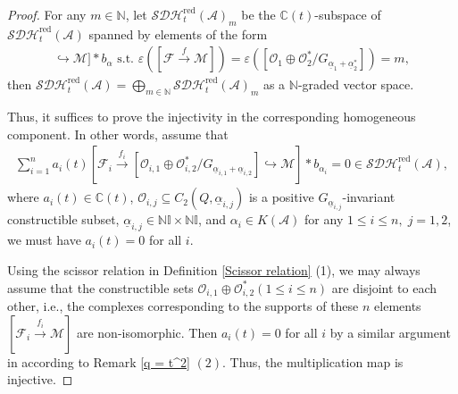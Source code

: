 \documentclass[12pt]{amsart}
\theoremstyle{definition}
\numberwithin{equation}{section}
\begin{document}
\begin{proof}
    For any $ m \in \mathbb{N} $, let $ \mathcal{SDH}^{\mathrm{red}}_t(\mathcal{A})_m  $ be the $ \mathbb{C}(t) $-subspace of $ \mathcal{SDH}^{\mathrm{red}}_t(\mathcal{A}) $ spanned by elements of the form
    \begin{align*}
        [\mathcal{F}\xrightarrow{f}[\mathcal{O}_1\oplus \mathcal{O}_2^*/G_{\underline{\alpha}_1+\underline{\alpha}_2^*}] \hookrightarrow \mathcal{M}] * b_{\alpha} \text{ s.t. } \varepsilon([\mathcal{F}\xrightarrow{f}\mathcal{M}])= \varepsilon([\mathcal{O}_1\oplus \mathcal{O}_2^*/G_{\underline{\alpha}_1+\underline{\alpha}_2^*}])=m,
    \end{align*}
    then $ \mathcal{SDH}^{\mathrm{red}}_t(\mathcal{A}) = \bigoplus_{m \in \mathbb{N}}  \mathcal{SDH}^{\mathrm{red}}_t(\mathcal{A})_m  $ as a $ \mathbb{N} $-graded vector space.
    
    Thus, it suffices to prove the injectivity in the corresponding homogeneous component. 
    In other words, assume that
    \begin{align*}
        \sum_{i=1}^n a_i(t) [\mathcal{F}_i \xrightarrow{f_i}[\mathcal{O}_{i,1} \oplus \mathcal{O}_{i,2}^*/G_{\underline{\alpha}_{i,1}+\underline{\alpha}_{i,2}}] \hookrightarrow \mathcal{M}] * b_{\alpha_i} = 0 \in  \mathcal{SDH}^{\mathrm{red}}_t(\mathcal{A}),
    \end{align*}
    where $ a_i(t) \in \mathbb{C}(t) $, $ \mathcal{O}_{i,j} \subseteq C_2(Q, \underline{\alpha}_{i,j}) $ is a positive $ G_{\underline{\alpha}_{i,j}} $-invariant constructible subset, $ \underline{\alpha}_{i,j} \in \mathbb{N}\mathbb{I} \times \mathbb{N}\mathbb{I} $, and $ \alpha_i \in K(\mathcal{A}) $ for any $ 1 \leqslant i \leqslant n,\;j=1,2 $, we must have $ a_i(t) = 0 $ for all $ i $. 

    Using the scissor relation in Definition \ref{Scissor relation} (1), we may always assume that the constructible sets $ \mathcal{O}_{i,1} \oplus \mathcal{O}_{i,2}^* (1 \leqslant i \leqslant n)$ are disjoint to each other, i.e., the complexes corresponding to the supports of these $ n $ elements  $ [\mathcal{F}_i \xrightarrow{f_i} \mathcal{M}] $ are non-isomorphic. 
    Then $ a_i(t) = 0 $ for all $ i $ by a similar argument in \cite[Theorem 3.20]{LP21} according to Remark \ref{q = t^2} $ (2) $. 
    Thus, the multiplication map is injective. 


\end{proof}
\end{document}
